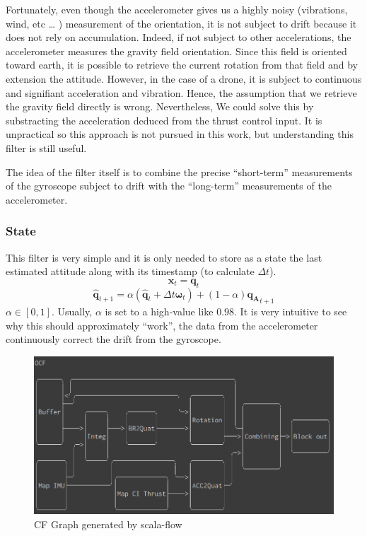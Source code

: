 \documentclass[12pt,]{article}
\begin{document}
Fortunately, even though the accelerometer gives us a highly noisy
(vibrations, wind, etc \ldots{} ) measurement of the orientation, it is
not subject to drift because it does not rely on accumulation. Indeed,
if not subject to other accelerations, the accelerometer measures the
gravity field orientation. Since this field is oriented toward earth, it
is possible to retrieve the current rotation from that field and by
extension the attitude. However, in the case of a drone, it is subject
to continuous and signifiant acceleration and vibration. Hence, the
assumption that we retrieve the gravity field directly is wrong.
Nevertheless, We could solve this by substracting the acceleration
deduced from the thrust control input. It is unpractical so this
approach is not pursued in this work, but understanding this filter is
still useful.

The idea of the filter itself is to combine the precise ``short-term''
measurements of the gyroscope subject to drift with the ``long-term''
measurements of the accelerometer.

\subsubsection{State}\label{state-1}

This filter is very simple and it is only needed to store as a state the
last estimated attitude along with its timestamp (to calculate
\(\Delta t\)). \[\mathbf{x}_t = \mathbf{q}_t\]
\[\hat{\mathbf{q}}_{t+1} = \alpha (\hat{\mathbf{q}}_t + \Delta t \mathbf{\omega}_t) + (1 - \alpha) {\mathbf{q_A}}_{t+1}\]
\(\alpha \in [0, 1]\). Usually, \(\alpha\) is set to a high-value like
\(0.98\). It is very intuitive to see why this should approximately
``work'', the data from the accelerometer continuously correct the drift
from the gyroscope.

\begin{figure}
\centering
\includegraphics{ocf.png}
\caption{CF Graph generated by scala-flow}
\end{figure}
\end{document}

